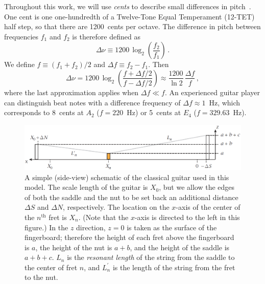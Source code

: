 Throughout this work, we will use \emph{cents} to describe small differences in pitch~\cite{ref:durfee2015pms}. One cent is one one-hundredth of a Twelve-Tone Equal Temperament (12-TET) half step, so that there are 1200~cents per octave. The difference in pitch between frequencies $f_1$ and $f_2$ is therefore defined as
 \begin{equation} \label{eqn:cents_def}
\Delta \nu \equiv 1200\, \log_2\left(\frac{f_2}{f_1}\right)\, .
 \end{equation}
We define $f \equiv (f_1 + f_2) / 2$ and $\Delta f \equiv f_2 - f_1$. Then
 \begin{equation} \label{eqn:cents_approx}
\Delta \nu = 1200\, \log_2\left(\frac{f + \Delta f / 2}{f - \Delta f /2}\right) \approx \frac{1200}{\ln 2}\, \frac{\Delta f}{f}\, ,
 \end{equation}
where the last approximation applies when $\Delta f \ll f$. An experienced guitar player can distinguish beat notes with a difference frequency of $\Delta f \approx 1$~Hz, which corresponds to 8~cents at $A_2$ ($f = 220$~Hz) or 5~cents at $E_4$ ($f = 329.63$~Hz).

 \begin{figure}
  \centering
  \includegraphics[width=6.0in]{figures/guitar_schematic}
  \caption{\label{fig:guitar_schematic} A simple (side-view) schematic of the classical guitar used in this model. The scale length of the guitar is $X_0$, but we allow the edges of both the saddle and the nut to be set back an additional distance $\Delta S$ and $\Delta N$, respectively. The location on the $x$-axis of the center of the $n^\textrm{th}$ fret is $X_n$. (Note that the $x$-axis is directed to the left in this figure.) In the $z$ direction, $z = 0$ is taken as the surface of the fingerboard; therefore the height of each fret above the fingerboard is $a$, the height of the nut is $a + b$, and the height of the saddle is $a + b + c$. $L_n$ is the \emph{resonant length} of the string from the saddle to the center of fret $n$, and $L^\prime_n$ is the length of the string from the fret to the nut.}
 \end{figure}

